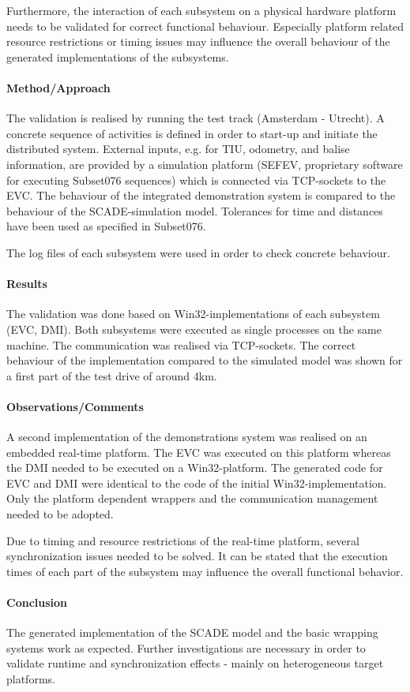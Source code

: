 Furthermore, the interaction of each subsystem on a physical hardware
platform needs to be validated for correct functional
behaviour. Especially platform related resource restrictions or timing
issues may influence the overall behaviour of the generated
implementations of the subsystems.


\paragraph{Method/Approach}
The validation is realised by running the test track (Amsterdam -
Utrecht). A concrete sequence of activities is defined in order to
start-up and initiate the distributed system. External inputs,
e.g. for TIU, odometry, and balise information, are provided by a
simulation platform (SEFEV, proprietary software for executing
Subset076 sequences) which is connected via TCP-sockets to the
EVC. The behaviour of the integrated demonstration system is compared
to the behaviour of the SCADE-simulation model. Tolerances for time
and distances have been used as specified in Subset076.

The log files of each subsystem were used in order to check concrete behaviour.


\paragraph{Results}
The validation was done based on Win32-implementations of each
subsystem (EVC, DMI). Both subsystems were executed as single
processes on the same machine. The communication was realised via
TCP-sockets. The correct behaviour of the implementation compared to
the simulated model was shown for a first part of the test drive of
around 4km.


\paragraph{Observations/Comments}
A second implementation of the demonstrations system was realised on
an embedded real-time platform. The EVC was executed on this platform
whereas the DMI needed to be executed on a Win32-platform. The
generated code for EVC and DMI were identical to the code of the
initial Win32-implementation. Only the platform dependent wrappers and
the communication management needed to be adopted.

Due to timing and resource restrictions of the real-time platform,
several synchronization issues needed to be solved. It can be stated
that the execution times of each part of the subsystem may influence
the overall functional behavior.


\paragraph{Conclusion}
The generated implementation of the SCADE model and the basic wrapping
systems work as expected. Further investigations are necessary in
order to validate runtime and synchronization effects - mainly on
heterogeneous target platforms.
